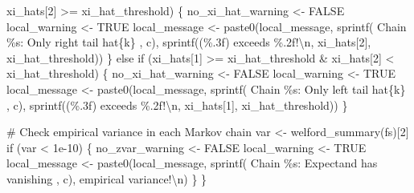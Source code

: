 \documentclass[
  letterpaper,
  DIV=11,
  numbers=noendperiod]{scrartcl}
\newenvironment{Shaded}{\begin{snugshade}}{\end{snugshade}}
\newcommand{\CommentTok}[1]{\textcolor[rgb]{0.37,0.37,0.37}{#1}}
\newcommand{\ConstantTok}[1]{\textcolor[rgb]{0.56,0.35,0.01}{#1}}
\newcommand{\ControlFlowTok}[1]{\textcolor[rgb]{0.00,0.23,0.31}{#1}}
\newcommand{\DecValTok}[1]{\textcolor[rgb]{0.68,0.00,0.00}{#1}}
\newcommand{\FloatTok}[1]{\textcolor[rgb]{0.68,0.00,0.00}{#1}}
\newcommand{\FunctionTok}[1]{\textcolor[rgb]{0.28,0.35,0.67}{#1}}
\newcommand{\NormalTok}[1]{\textcolor[rgb]{0.00,0.23,0.31}{#1}}
\newcommand{\OtherTok}[1]{\textcolor[rgb]{0.00,0.23,0.31}{#1}}
\newcommand{\SpecialCharTok}[1]{\textcolor[rgb]{0.37,0.37,0.37}{#1}}
\newcommand{\StringTok}[1]{\textcolor[rgb]{0.13,0.47,0.30}{#1}}
\begin{document}
\begin{Shaded}
\begin{Highlighting}[]
\NormalTok{                 xi\_hats[}\DecValTok{2}\NormalTok{] }\SpecialCharTok{\textgreater{}=}\NormalTok{ xi\_hat\_threshold) \{}
\NormalTok{        no\_xi\_hat\_warning }\OtherTok{\textless{}{-}} \ConstantTok{FALSE}
\NormalTok{        local\_warning }\OtherTok{\textless{}{-}} \ConstantTok{TRUE}
\NormalTok{        local\_message }\OtherTok{\textless{}{-}}
          \FunctionTok{paste0}\NormalTok{(local\_message,}
                 \FunctionTok{sprintf}\NormalTok{(}\StringTok{\textquotesingle{}  Chain \%s: Only right tail hat\{k\} \textquotesingle{}}\NormalTok{, c),}
                 \FunctionTok{sprintf}\NormalTok{(}\StringTok{\textquotesingle{}(\%.3f) exceeds \%.2f!}\SpecialCharTok{\textbackslash{}n}\StringTok{\textquotesingle{}}\NormalTok{,}
\NormalTok{                         xi\_hats[}\DecValTok{2}\NormalTok{], xi\_hat\_threshold))}
\NormalTok{      \} }\ControlFlowTok{else} \ControlFlowTok{if}\NormalTok{ (xi\_hats[}\DecValTok{1}\NormalTok{] }\SpecialCharTok{\textgreater{}=}\NormalTok{ xi\_hat\_threshold }\SpecialCharTok{\&} 
\NormalTok{                 xi\_hats[}\DecValTok{2}\NormalTok{] }\SpecialCharTok{\textless{}}\NormalTok{ xi\_hat\_threshold) \{}
\NormalTok{        no\_xi\_hat\_warning }\OtherTok{\textless{}{-}} \ConstantTok{FALSE}
\NormalTok{        local\_warning }\OtherTok{\textless{}{-}} \ConstantTok{TRUE}
\NormalTok{        local\_message }\OtherTok{\textless{}{-}}
          \FunctionTok{paste0}\NormalTok{(local\_message,}
                 \FunctionTok{sprintf}\NormalTok{(}\StringTok{\textquotesingle{}  Chain \%s: Only left tail hat\{k\} \textquotesingle{}}\NormalTok{, c),}
                 \FunctionTok{sprintf}\NormalTok{(}\StringTok{\textquotesingle{}(\%.3f) exceeds \%.2f!}\SpecialCharTok{\textbackslash{}n}\StringTok{\textquotesingle{}}\NormalTok{,}
\NormalTok{                         xi\_hats[}\DecValTok{1}\NormalTok{], xi\_hat\_threshold))}
\NormalTok{      \}}
      
      \CommentTok{\# Check empirical variance in each Markov chain}
\NormalTok{      var }\OtherTok{\textless{}{-}} \FunctionTok{welford\_summary}\NormalTok{(fs)[}\DecValTok{2}\NormalTok{]}
      \ControlFlowTok{if}\NormalTok{ (var }\SpecialCharTok{\textless{}} \FloatTok{1e{-}10}\NormalTok{) \{}
\NormalTok{        no\_zvar\_warning }\OtherTok{\textless{}{-}} \ConstantTok{FALSE}
\NormalTok{        local\_warning }\OtherTok{\textless{}{-}} \ConstantTok{TRUE}
\NormalTok{        local\_message }\OtherTok{\textless{}{-}}
          \FunctionTok{paste0}\NormalTok{(local\_message,}
                 \FunctionTok{sprintf}\NormalTok{(}\StringTok{\textquotesingle{}  Chain \%s: Expectand has vanishing \textquotesingle{}}\NormalTok{, c),}
                         \StringTok{\textquotesingle{}empirical variance!}\SpecialCharTok{\textbackslash{}n}\StringTok{\textquotesingle{}}\NormalTok{)}
\NormalTok{      \}}
\NormalTok{    \}}
  

\end{Highlighting}
\end{Shaded}
\end{document}
